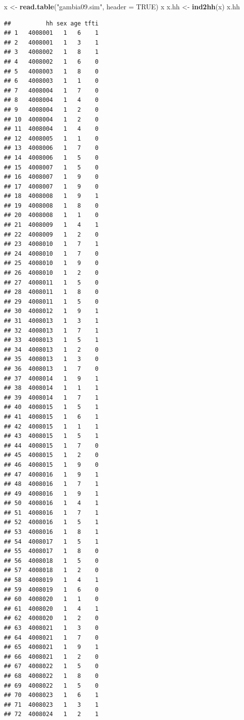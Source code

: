 \documentclass[12pt,a4paper]{book}
\newenvironment{Shaded}{\begin{snugshade}}{\end{snugshade}}
\newcommand{\KeywordTok}[1]{\textcolor[rgb]{0.13,0.29,0.53}{\textbf{#1}}}
\newcommand{\DataTypeTok}[1]{\textcolor[rgb]{0.13,0.29,0.53}{#1}}
\newcommand{\StringTok}[1]{\textcolor[rgb]{0.31,0.60,0.02}{#1}}
\newcommand{\OtherTok}[1]{\textcolor[rgb]{0.56,0.35,0.01}{#1}}
\newcommand{\NormalTok}[1]{#1}
\theoremstyle{definition}
\theoremstyle{definition}
\theoremstyle{definition}
\theoremstyle{remark}
\begin{document}
\begin{Shaded}
\begin{Highlighting}[]
\NormalTok{x <-}\StringTok{ }\KeywordTok{read.table}\NormalTok{(}\StringTok{"gambia09.sim"}\NormalTok{, }\DataTypeTok{header =} \OtherTok{TRUE}\NormalTok{)}
\NormalTok{x}
\NormalTok{x.hh <-}\StringTok{ }\KeywordTok{ind2hh}\NormalTok{(x)}
\NormalTok{x.hh}
\end{Highlighting}
\end{Shaded}

\begin{verbatim}
##          hh sex age tfti
## 1   4008001   1   6    1
## 2   4008001   1   3    1
## 3   4008002   1   8    1
## 4   4008002   1   6    0
## 5   4008003   1   8    0
## 6   4008003   1   1    0
## 7   4008004   1   7    0
## 8   4008004   1   4    0
## 9   4008004   1   2    0
## 10  4008004   1   2    0
## 11  4008004   1   4    0
## 12  4008005   1   1    0
## 13  4008006   1   7    0
## 14  4008006   1   5    0
## 15  4008007   1   5    0
## 16  4008007   1   9    0
## 17  4008007   1   9    0
## 18  4008008   1   9    1
## 19  4008008   1   8    0
## 20  4008008   1   1    0
## 21  4008009   1   4    1
## 22  4008009   1   2    0
## 23  4008010   1   7    1
## 24  4008010   1   7    0
## 25  4008010   1   9    0
## 26  4008010   1   2    0
## 27  4008011   1   5    0
## 28  4008011   1   8    0
## 29  4008011   1   5    0
## 30  4008012   1   9    1
## 31  4008013   1   3    1
## 32  4008013   1   7    1
## 33  4008013   1   5    1
## 34  4008013   1   2    0
## 35  4008013   1   3    0
## 36  4008013   1   7    0
## 37  4008014   1   9    1
## 38  4008014   1   1    1
## 39  4008014   1   7    1
## 40  4008015   1   5    1
## 41  4008015   1   6    1
## 42  4008015   1   1    1
## 43  4008015   1   5    1
## 44  4008015   1   7    0
## 45  4008015   1   2    0
## 46  4008015   1   9    0
## 47  4008016   1   9    1
## 48  4008016   1   7    1
## 49  4008016   1   9    1
## 50  4008016   1   4    1
## 51  4008016   1   7    1
## 52  4008016   1   5    1
## 53  4008016   1   8    1
## 54  4008017   1   5    1
## 55  4008017   1   8    0
## 56  4008018   1   5    0
## 57  4008018   1   2    0
## 58  4008019   1   4    1
## 59  4008019   1   6    0
## 60  4008020   1   1    0
## 61  4008020   1   4    1
## 62  4008020   1   2    0
## 63  4008021   1   3    0
## 64  4008021   1   7    0
## 65  4008021   1   9    1
## 66  4008021   1   2    0
## 67  4008022   1   5    0
## 68  4008022   1   8    0
## 69  4008022   1   5    0
## 70  4008023   1   6    1
## 71  4008023   1   3    1
## 72  4008024   1   2    1

\end{verbatim}
\end{document}
